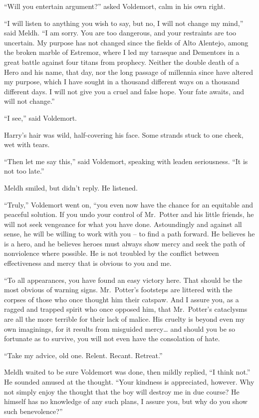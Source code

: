 ``Will you entertain argument?'' asked Voldemort, calm in his own right.

``I will listen to anything you wish to say, but no, I will not change
my mind,'' said Meldh. ``I am sorry. You are too dangerous, and your
restraints are too uncertain. My purpose has not changed since the
fields of Alto Alentejo, among the broken marble of Estremoz, where I
led my tarasque and Dementors in a great battle against four titans from
prophecy. Neither the double death of a Hero and his name, that day, nor
the long passage of millennia since have altered my purpose, which I
have sought in a thousand different ways on a thousand different days. I
will not give you a cruel and false hope. Your fate awaits, and will not
change.''

``I see,'' said Voldemort.

Harry's hair was wild, half-covering his face. Some strands stuck to one
cheek, wet with tears.

``Then let me say this,'' said Voldemort, speaking with leaden
seriousness. ``It is not too late.''

Meldh smiled, but didn't reply. He listened.

``Truly,'' Voldemort went on, ``you even now have the chance for an
equitable and peaceful solution. If you undo your control of Mr.~Potter
and his little friends, he will not seek vengeance for what you have
done. Astoundingly and against all sense, he will be willing to work
with you -- to find a path forward. He believes he is a hero, and he
believes heroes must always show mercy and seek the path of nonviolence
where possible. He is not troubled by the conflict between effectiveness
and mercy that is obvious to you and me.

``To all appearances, you have found an easy victory here. That should
be the most obvious of warning signs. Mr.~Potter's footsteps are
littered with the corpses of those who once thought him their catspaw.
And I assure you, as a ragged and trapped spirit who once opposed him,
that Mr.~Potter's cataclysms are all the more terrible for their lack of
malice. His cruelty is beyond even my own imaginings, for it results
from misguided mercy\ldots{} and should you be so fortunate as to
survive, you will not even have the consolation of hate.

``Take my advice, old one. Relent. Recant. Retreat.''

Meldh waited to be sure Voldemort was done, then mildly replied, ``I
think not.'' He sounded amused at the thought. ``Your kindness is
appreciated, however. Why not simply enjoy the thought that the boy will
destroy me in due course? He himself has no knowledge of any such plans,
I assure you, but why do you show such benevolence?''


